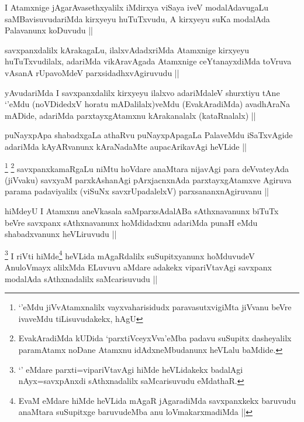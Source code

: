 \begin{artha}
I Atamxnige jAgarAvasethxyalilx iMdirxya viSaya iveV modalAdavugaLu saMBavisuvudariMda kirxyeyu huTuTxvudu, A kirxyeyu suKa modalAda Palavanunx koDuvudu ||
\end{artha}

\begin{artha}
savxpanxdalilx kArakagaLu, ilalxvAdadxriMda Atamxnige kirxyeyu huTuTxvudilalx, adariMda vikAravAgada Atamxnige ceYtanayxdiMda toVruva vAsanA rUpavoMdeV parxsidadhxvAgiruvudu ||
\end{artha}


\begin{artha}
yAvudariMda I savxpanxdalilx kirxyeyu ilalxvo adariMdaleV shurxtiyu tAne `\stext'eMdu (noVDidedxV horatu mADalilalx)veMdu (EvakAradiMda) avadhAraNa mADide, adariMda parxtayxgAtamxnu kArakanalalx (kataRnalalx) ||
\end{artha}

\begin{artha}
puNayxpApa shabadxgaLa athaRvu puNayxpApagaLa PalaveMdu iSaTxvAgide adariMda kAyARvanunx kAraNadaMte aupacArikavAgi heVLide ||
\end{artha}

\begin{artha}
\footnote{`\stext'eMdu jiVvAtamxnalilx vayxvaharisidudx paravasutxvigiMta jiVvanu beVre ivaveMdu tiLisuvudakekx, hAgU}
\footnote{EvakAradiMda kUDida `parxtiVceyxVva'eMba padavu suSupitx dasheyalilx paramAtamx noDane Atamxnu idAdxneMbudanunx heVLalu baMdide.}
savxpanxkamaRgaLu niMtu hoVdare anaMtara nijavAgi para deVvateyAda (jiVvaku)
savxyaM parxkAshanAgi pArxjacnxnAda parxtayxgAtamxve Agiruva parama padaviyalilx (viSuNx savxrUpadalelxV) parxsananxnAgiruvanu ||
\end{artha}


\begin{artha}
hiMdeyU I Atamxnu aneVkasala saMparxsAdalABa sAthxnavanunx biTuTx beVre savxpanx sAthxnavanunx hoMdidadxnu adariMda punaH eMdu shabadxvanunx heVLiruvudu ||
\end{artha}

\begin{artha}
\footnote{`\stext' eMdare parxti=vipariVtavAgi hiMde heVLidakekx badalAgi nAyx=savxpAnxdi sAthxnadalilx saMcarisuvudu eMdathaR.}
I riVti hiMde\footnote{EvaM eMdare hiMde heVLida mAgaR jAgaradiMda savxpanxkekx baruvudu anaMtara suSupitxge baruvudeMba anu loVmakarxmadiMda ||} heVLida mAgaRdalilx suSupitxyanunx hoMduvudeV AnuloVmayx alilxMda ELuvuvu aMdare adakekx vipariVtavAgi savxpanx modalAda sAthxnadalilx saMcarisuvudu ||
\end{artha}

